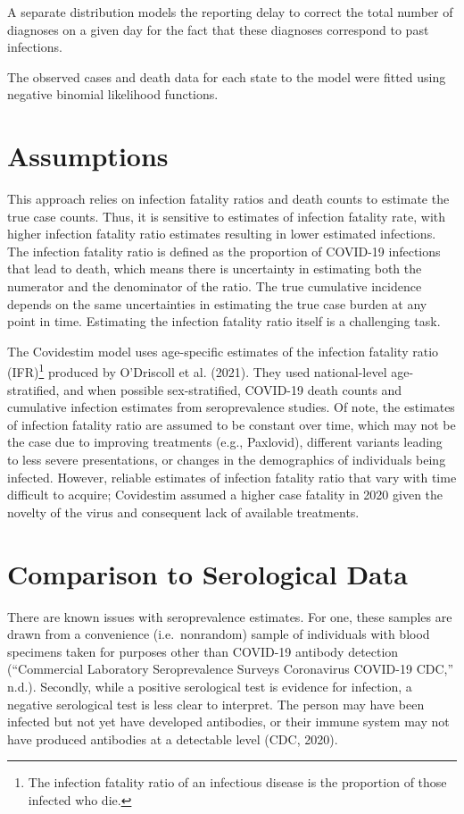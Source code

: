 \documentclass[12pt,twoside]{smiththesis}
\begin{document}
A separate distribution models the reporting delay to correct the total number of diagnoses on a given day for the fact that these diagnoses correspond to past infections.

The observed cases and death data for each state to the model were fitted using negative binomial likelihood functions.

\hypertarget{assumptions}{%
\section{Assumptions}\label{assumptions}}

This approach relies on infection fatality ratios and death counts to estimate the true case counts. Thus, it is sensitive to estimates of infection fatality rate, with higher infection fatality ratio estimates resulting in lower estimated infections. The infection fatality ratio is defined as the proportion of COVID-19 infections that lead to death, which means there is uncertainty in estimating both the numerator and the denominator of the ratio. The true cumulative incidence depends on the same uncertainties in estimating the true case burden at any point in time. Estimating the infection fatality ratio itself is a challenging task.

The Covidestim model uses age-specific estimates of the infection fatality ratio (IFR)\footnote{The infection fatality ratio of an infectious disease is the proportion of those infected who die.} produced by O'Driscoll et al. (2021). They used national-level age-stratified, and when possible sex-stratified, COVID-19 death counts and cumulative infection estimates from seroprevalence studies. Of note, the estimates of infection fatality ratio are assumed to be constant over time, which may not be the case due to improving treatments (e.g., Paxlovid), different variants leading to less severe presentations, or changes in the demographics of individuals being infected. However, reliable estimates of infection fatality ratio that vary with time difficult to acquire; Covidestim assumed a higher case fatality in 2020 given the novelty of the virus and consequent lack of available treatments.

\hypertarget{comparison-to-serological-data}{%
\section{Comparison to Serological Data}\label{comparison-to-serological-data}}

There are known issues with seroprevalence estimates. For one, these samples are drawn from a convenience (i.e.~nonrandom) sample of individuals with blood specimens taken for purposes other than COVID-19 antibody detection ({``Commercial {Laboratory Seroprevalence Surveys} \textbar{} {Coronavirus} \textbar{} {COVID-19} \textbar{} {CDC},''} n.d.). Secondly, while a positive serological test is evidence for infection, a negative serological test is less clear to interpret. The person may have been infected but not yet have developed antibodies, or their immune system may not have produced antibodies at a detectable level (CDC, 2020).
\end{document}
